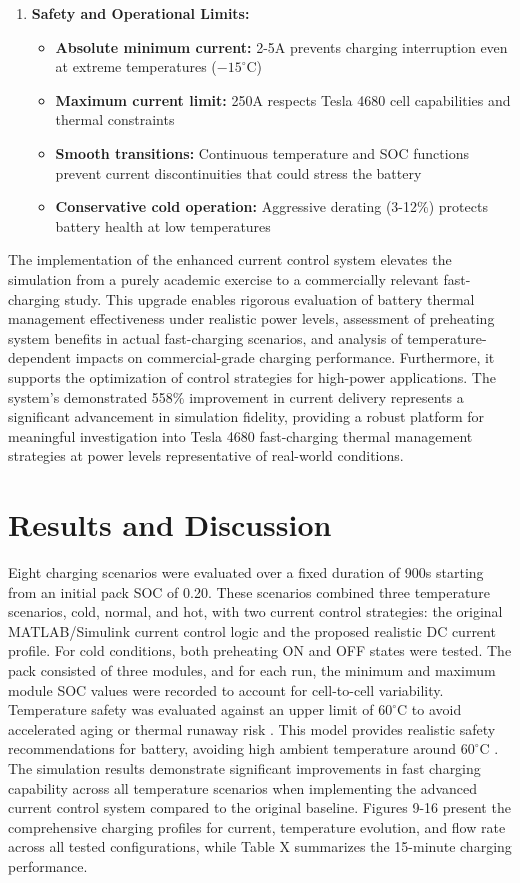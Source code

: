 \documentclass[conference]{IEEEtran}
\begin{document}
\begin{enumerate}
    \item \textbf{Safety and Operational Limits:} 
    \begin{itemize}
        \item \textbf{Absolute minimum current:} 2-5A prevents charging interruption even at extreme temperatures ($-15^\circ$C)
        \item \textbf{Maximum current limit:}  250A respects Tesla 4680 cell capabilities and thermal constraints
        \item \textbf{Smooth transitions:} Continuous temperature and SOC functions prevent current discontinuities that could stress the battery
        \item \textbf{Conservative cold operation:} Aggressive derating (3-12$\%$) protects battery health at low temperatures
    \end{itemize}
\end{enumerate}

The implementation of the enhanced current control system elevates the simulation from a purely academic exercise to a commercially relevant fast-charging study. This upgrade enables rigorous evaluation of battery thermal management effectiveness under realistic power levels, assessment of preheating system benefits in actual fast-charging scenarios, and analysis of temperature-dependent impacts on commercial-grade charging performance. Furthermore, it supports the optimization of control strategies for high-power applications. The system’s demonstrated 558$\%$ improvement in current delivery represents a significant advancement in simulation fidelity, providing a robust platform for meaningful investigation into Tesla 4680 fast-charging thermal management strategies at power levels representative of real-world conditions.


\section{Results and Discussion}
Eight charging scenarios were evaluated over a fixed duration of 900s starting from an initial pack SOC of 
0.20. These scenarios combined three temperature scenarios, cold, normal, and hot, with two current control strategies: the original MATLAB/Simulink current control logic and the proposed realistic DC current profile. For cold conditions, both preheating ON and OFF states were tested. The pack consisted of three modules, and for each run, the minimum and maximum module SOC values were recorded to account for cell-to-cell variability. Temperature safety was evaluated against an upper limit of $60^\circ$C to avoid accelerated aging or thermal runaway risk \cite{tesla2025charging}. This model provides realistic safety recommendations for battery, avoiding high ambient temperature around $60^\circ$C \cite{tesla2025manual}. 
The simulation results demonstrate significant improvements in fast charging capability across all temperature scenarios when implementing the advanced current control system compared to the original baseline. Figures 9-16 present the comprehensive charging profiles for current, temperature evolution, and flow rate across all tested configurations, while Table X summarizes the 15-minute charging performance.
\end{document}
